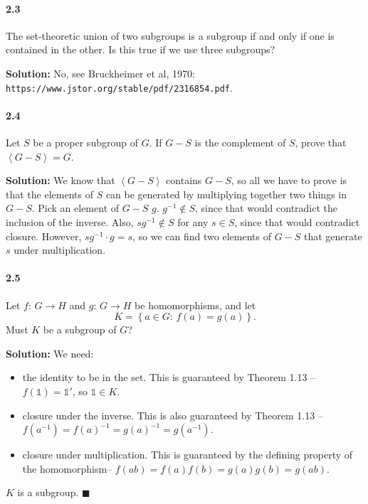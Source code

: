 \documentclass[12pt,a4paper]{article}
\providecommand{\id}{\mathbb{1}}
\providecommand{\soln}{\textbf{Solution: }}
\providecommand{\set}[1]{\left \lbrace #1 \right \rbrace}
\renewcommand{\iff}{\textrm{if and only if}\xspace}
\providecommand{\inv}{^{-1}}
\providecommand{\gen}[1]{\left \langle #1 \right \rangle}
\providecommand{\hism}{homomorphism\xspace}
\begin{document}
\paragraph*{2.3}
The set-theoretic union of two subgroups is a subgroup \iff one is contained in the other. 
Is this true if we use three subgroups?

\soln No, see Bruckheimer et al, 1970: \texttt{https://www.jstor.org/stable/pdf/2316854.pdf}.

\paragraph*{2.4}
Let $S$ be a proper subgroup of $G$. 
If $G - S$ is the complement of $S$, prove that $\gen{G - S} = G$.

\soln We know that $\gen{G - S}$ contains $G - S$, so all we have to prove is that the elements of $S$ can be generated by multiplying together two things in $G - S$.
Pick an element of $G - S$ $g$. 
$g^{-1} \notin S$, since that would contradict the inclusion of the inverse. 
Also, $sg^{-1} \notin S$ for any $s \in S$, since that would contradict closure.  
However, $sg^{-1} \cdot g = s$, so we can find two elements of $G - S$ that generate $s$ under multiplication. 

\paragraph*{2.5}
Let $f: \, G \rightarrow H$ and $g: \, G \rightarrow H$ be \hism{s}, and let
\begin{equation*}
K = \set{a \in G: \, f(a) = g(a)}.
\end{equation*}
Must $K$ be a subgroup of $G$?

\soln We need: 
\begin{itemize}
	\item the identity to be in the set.
	This is guaranteed by Theorem 1.13 -- $f(\id) = \id'$, so $\id \in K$.
	\item closure under the inverse. 
	This is also guaranteed by Theorem 1.13 -- $f(a\inv) = f(a)\inv = g(a)\inv = g(a\inv)$.
	\item closure under multiplication. 
	This is guaranteed by the defining property of the \hism -- $f(a b) = f(a) f(b) = g(a) g(b) = g(a b)$. 
\end{itemize}
$K$ is a subgroup. $\blacksquare$
\end{document}
